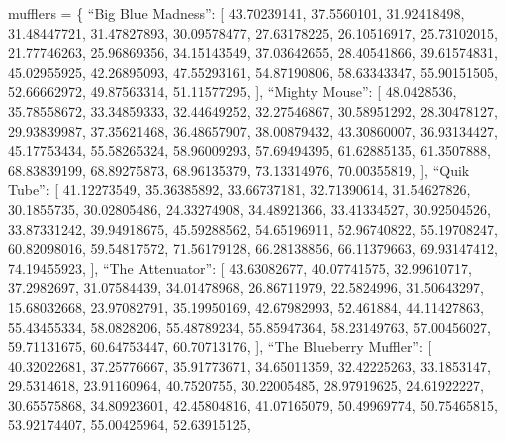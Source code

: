 \documentclass[presentation]{beamer}
\begin{document}
mufflers = \{
    ``Big Blue Madness'': [
        43.70239141,
        37.5560101,
        31.92418498,
        31.48447721,
        31.47827893,
        30.09578477,
        27.63178225,
        26.10516917,
        25.73102015,
        21.77746263,
        25.96869356,
        34.15143549,
        37.03642655,
        28.40541866,
        39.61574831,
        45.02955925,
        42.26895093,
        47.55293161,
        54.87190806,
        58.63343347,
        55.90151505,
        52.66662972,
        49.87563314,
        51.11577295,
    ],
    ``Mighty Mouse'': [
        48.0428536,
        35.78558672,
        33.34859333,
        32.44649252,
        32.27546867,
        30.58951292,
        28.30478127,
        29.93839987,
        37.35621468,
        36.48657907,
        38.00879432,
        43.30860007,
        36.93134427,
        45.17753434,
        55.58265324,
        58.96009293,
        57.69494395,
        61.62885135,
        61.3507888,
        68.83839199,
        68.89275873,
        68.96135379,
        73.13314976,
        70.00355819,
    ],
    ``Quik Tube'': [
        41.12273549,
        35.36385892,
        33.66737181,
        32.71390614,
        31.54627826,
        30.1855735,
        30.02805486,
        24.33274908,
        34.48921366,
        33.41334527,
        30.92504526,
        33.87331242,
        39.94918675,
        45.59288562,
        54.65196911,
        52.96740822,
        55.19708247,
        60.82098016,
        59.54817572,
        71.56179128,
        66.28138856,
        66.11379663,
        69.93147412,
        74.19455923,
    ],
    ``The Attenuator'': [
        43.63082677,
        40.07741575,
        32.99610717,
        37.2982697,
        31.07584439,
        34.01478968,
        26.86711979,
        22.5824996,
        31.50643297,
        15.68032668,
        23.97082791,
        35.19950169,
        42.67982993,
        52.461884,
        44.11427863,
        55.43455334,
        58.0828206,
        55.48789234,
        55.85947364,
        58.23149763,
        57.00456027,
        59.71131675,
        60.64753447,
        60.70713176,
    ],
    ``The Blueberry Muffler'': [
        40.32022681,
        37.25776667,
        35.91773671,
        34.65011359,
        32.42225263,
        33.1853147,
        29.5314618,
        23.91160964,
        40.7520755,
        30.22005485,
        28.97919625,
        24.61922227,
        30.65575868,
        34.80923601,
        42.45804816,
        41.07165079,
        50.49969774,
        50.75465815,
        53.92174407,
        55.00425964,
        52.63915125,
\end{document}
